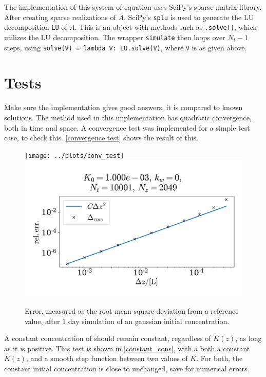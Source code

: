 \documentclass{article}
\begin{document}
    The implementation of this system of equation uses SciPy's sparse matrix library. After creating sparse realizations of $A$, SciPy's \verb|splu| is used to generate the LU decomposition \verb|LU| of $A$. This is an object with methods such as \verb|.solve()|, which utilizes the LU decomposition. The wrapper \verb|simulate| then loops over $N_t-1$ steps, using \verb|solve(V) = lambda V: LU.solve(V)|, where \verb|V| is as given above. 

    \section*{Tests}
    Make sure the implementation gives good answers, it is compared to known solutions. The method used in this implementation has quadratic convergence, both in time and space. A convergence test was implemented for a simple test case, to check this. \autoref{convergence test} shows the result of this. 

    \begin{figure}
        \centering
        \texttt{[image: ../plots/conv\_test]}
        \includegraphics[width=.49\textwidth]{../plots/conv_test_z}
        \caption{Error, measured as the root mean square deviation from a reference value, after 1 day simulation of an gaussian initial concentration.}
        \label{convergence test}
    \end{figure}

    A constant concentration of  should remain constant, regardless of $K(z)$, as long as it is positive. This test is shown in \autoref{constant_cons}, with a both a constant $K(z)$, and a smooth step function between two values of $K$. For both, the constant initial concentration is close to unchanged, save for numerical errors.
\end{document}
